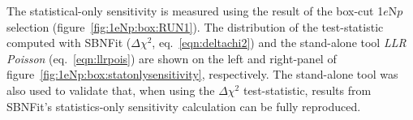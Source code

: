\documentclass[a4paper]{article}
\begin{document}
The statistical-only sensitivity is measured using the result of the box-cut 1$e$N$p$ selection (figure~\ref{fig:1eNp:box:RUN1}). The distribution of the test-statistic computed with SBNFit ($\Delta\chi^2$, eq.~\ref{eqn:deltachi2}) and the stand-alone tool \emph{LLR Poisson} (eq.~\ref{eqn:llrpois}) are shown on the left and right-panel of figure~\ref{fig:1eNp:box:statonlysensitivity}, respectively. The stand-alone tool was also used to validate that, when using the $\Delta\chi^2$ test-statistic, results from SBNFit's statistics-only sensitivity calculation can be fully reproduced.

{}
\end{document}
